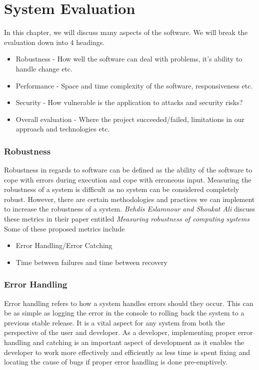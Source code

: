 \chapter{System Evaluation}
In this chapter, we will discuss many aspects of the software. We will break the evaluation down into 4 headings.
\begin{itemize}
  \item Robustness - How well the software can deal with problems, it's ability to handle change etc.
  \item Performance - Space and time complexity of the software, responsiveness etc.
  \item Security - How vulnerable is the application to attacks and security risks?
  \item Overall evaluation - Where the project succeeded/failed, limitations in our approach and technologies etc.
  \end{itemize}

  \subsection{Robustness}
  Robustness in regards to software can be defined as the ability of the software to cope with errors during execution and cope with erroneous input. Measuring the robustness of a system is difficult 
  as no system can be considered completely robust. However, there are certain methodologies and practices we can implement to increase the robustness of a system. {\textit{Behdis Eslamnour and Shoukat Ali}} discuss these metrics in their paper entitled {\textit{Measuring robustness of computing systems}}\cite{SoftwareRobustness}
  Some of these proposed metrics include
    \newline
    \begin{itemize}
      \item Error Handling/Error Catching
      \item Time between failures and time between recovery
    \end{itemize}

    \subsection{Error Handling}
    Error handling refers to how a system handles errors should they occur. This can be as simple as logging the error in the console to rolling back the system to a previous stable release.
    It is a vital aspect for any system from both the perspective of the user and developer. As a developer, implementing proper error handling and catching is an important aspect of development
    as it enables the developer to work more effectively and efficiently as less time is spent fixing and locating the cause of bugs if proper error handling is done pre-emptively.

